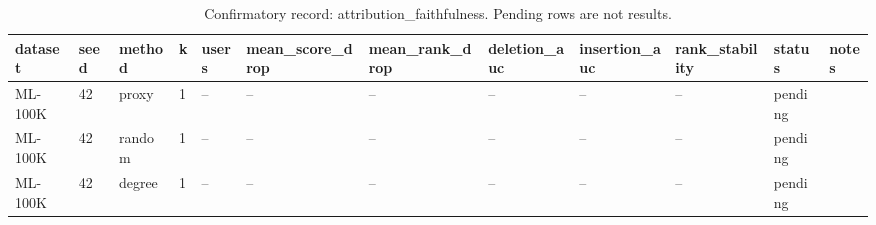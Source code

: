 \begin{table}[t]
\centering
\caption{Confirmatory record: attribution\_faithfulness. Pending rows are not results.}
\begin{tabular}{llllllllllll}
\toprule
\textbf{dataset} & \textbf{seed} & \textbf{method} & \textbf{k} & \textbf{users} & \textbf{mean\_score\_drop} & \textbf{mean\_rank\_drop} & \textbf{deletion\_auc} & \textbf{insertion\_auc} & \textbf{rank\_stability} & \textbf{status} & \textbf{notes} \\
\midrule
ML-100K & 42 & proxy & 1 & -- & -- & -- & -- & -- & -- & pending &  \\
ML-100K & 42 & random & 1 & -- & -- & -- & -- & -- & -- & pending &  \\
ML-100K & 42 & degree & 1 & -- & -- & -- & -- & -- & -- & pending &  \\
\bottomrule
\end{tabular}
\end{table}
